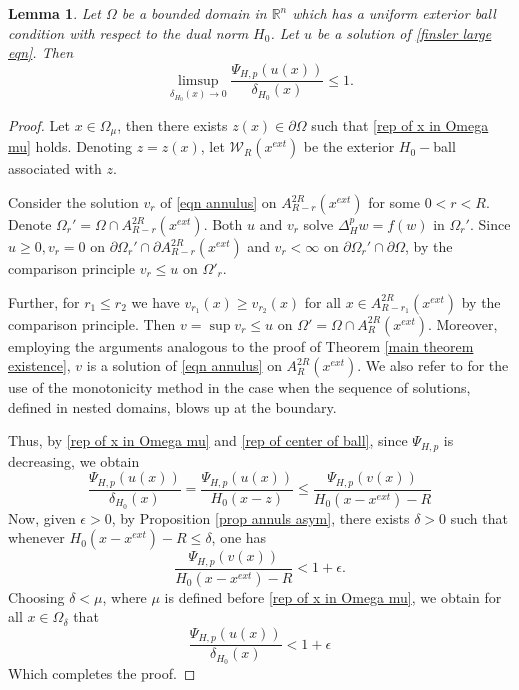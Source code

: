 \documentclass[11pt]{amsart}
\newtheorem{lemma}[theorem]{Lemma}
\newcommand{\rn}{\mathbb{R}^{n}}
\numberwithin{equation}{section}
\begin{document}
  \begin{lemma}\label{lemma asym 2}
       Let $\Omega$ be a bounded domain in $\rn$ which has a uniform exterior ball condition with respect to the dual norm $H_{0}$. Let $u$ be a solution of \eqref{finsler large eqn}. Then  
       \begin{equation*}
           \limsup_{\delta_{H_{0}}(x)\to 0}\frac{\Psi_{H,p}\left(u(x)\right)}{\delta_{H_{0}}(x)}\leq 1.
       \end{equation*}
       
   \end{lemma} 
   \begin{proof}

   Let $x\in \Omega_{\mu}$, then there exists $z(x)\in \partial\Omega$ such that \eqref{rep of x in Omega mu} holds. Denoting $z=z(x)$, let $\mathcal{W}_{R}(x^{ext})$ be the exterior $H_{0}-$ball associated with $z$. 
   
   Consider the solution $v_{r}$ of \eqref{eqn annulus} on $A_{R-r}^{2R}(x^{ext})$ for some $0<r<R$. Denote $\Omega_{r}'=\Omega\cap A_{R-r}^{2R}(x^{ext})$. Both $u$ and $v_{r}$ solve $\Delta_{H}^{p}w=f(w)$ in $\Omega_{r}'$. Since $u\geq 0, v_{r}=0$ on $\partial\Omega_{r}'\cap\partial A_{R-r}^{2R}(x^{ext})$ and $v_{r}<\infty$ on $\partial\Omega_{r}'\cap\partial\Omega$, by the comparison principle $v_{r}\leq u$ on $\Omega'_{r}$. 
   
   Further, for $r_{1}\leq r_{2}$ we have $v_{r_{1}}(x)\geq v_{r_{2}}(x)$ for all $x\in A_{R-r_{1}}^{2R}(x^{ext})$ by the comparison principle. Then $v=\sup v_{r}\leq u$ on $\Omega'=\Omega\cap A^{2R}_{R}(x^{ext})$. Moreover, employing the arguments analogous to the proof of Theorem \ref{main theorem existence}, $v$ is a solution of \eqref{eqn annulus} on $A_{R}^{2R}(x^{ext})$. We also refer to \cite[Theorem 4.3]{DattaIndro2026} for the use of the monotonicity method in the case when the sequence of solutions, defined in nested domains, blows up at the boundary. 
    
       Thus, by \eqref{rep of x in Omega mu} and \eqref{rep of center of ball}, since $\Psi_{H,p}$ is decreasing, we obtain
       \begin{equation*}
           \frac{\Psi_{H,p}\left(u(x)\right)}{\delta_{H_{0}}(x)}=\frac{\Psi_{H,p}\left(u(x)\right)}{H_{0}(x-z)}\leq \frac{\Psi_{H,p}\left(v(x)\right)}{H_{0}(x-x^{ext})-R}
       \end{equation*}
       Now, given $\epsilon>0$, by Proposition \ref{prop annuls asym}, there exists $\delta>0$ such that whenever $H_{0}(x-x^{ext})-R\leq \delta$, one has
       \begin{equation*}
           \frac{\Psi_{H,p}\left(v(x)\right)}{H_{0}(x-x^{ext})-R}< 1+\epsilon.
       \end{equation*}
       Choosing $\delta<\mu$, where $\mu$ is defined before \eqref{rep of x in Omega mu}, we obtain for all $x\in \Omega_{\delta}$ that 
       \begin{equation*}
        \frac{\Psi_{H,p}\left(u(x)\right)}{\delta_{H_{0}}(x)}< 1+\epsilon
       \end{equation*}
       Which completes the proof.
   \end{proof}
\end{document}
